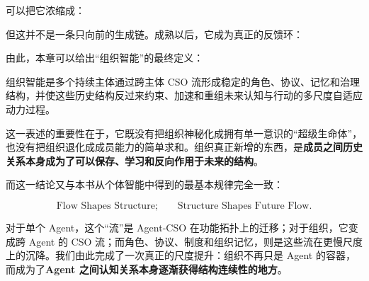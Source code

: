 可以把它浓缩成：
\begin{statementbox}
\centering
{}
\end{statementbox}

但这并不是一条只向前的生成链。成熟以后，它成为真正的反馈环：
\begin{statementbox}
\centering
{}
\end{statementbox}

由此，本章可以给出“组织智能”的最终定义：

\begin{definition*}
组织智能是多个持续主体通过跨主体 CSO 流形成稳定的角色、协议、记忆和治理结构，并使这些历史结构反过来约束、加速和重组未来认知与行动的多尺度自适应动力过程。
\end{definition*}

这一表述的重要性在于，它既没有把组织神秘化成拥有单一意识的“超级生命体”，也没有把组织退化成成员能力的简单求和。组织真正新增的东西，是\textbf{成员之间历史关系本身成为了可以保存、学习和反向作用于未来的结构}。

而这一结论又与本书从个体智能中得到的最基本规律完全一致：

\[
\boxed{
\text{Flow Shapes Structure;}
\qquad
\text{Structure Shapes Future Flow.}
}
\]

对于单个 Agent，这个“流”是 Agent-CSO 在功能拓扑上的迁移；对于组织，它变成跨 Agent 的 CSO 流；而角色、协议、制度和组织记忆，则是这些流在更慢尺度上的沉降。我们由此完成了一次真正的尺度提升：组织不再只是 Agent 的容器，而成为了\textbf{Agent 之间认知关系本身逐渐获得结构连续性的地方}。
